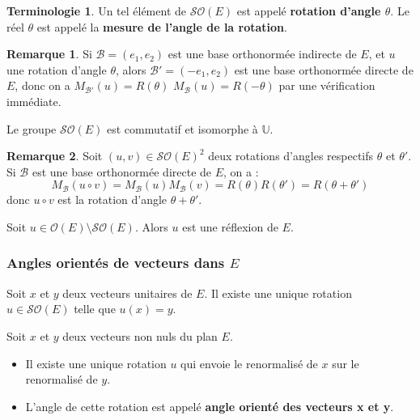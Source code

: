 \documentclass[french]{article}
\newcommand{\U}{\mathbb{U}}
\theoremstyle{plain}
\theoremstyle{definition}
\newtheorem*{rmq}{Remarque}
\newtheorem*{terminologie}{Terminologie}
\theoremstyle{remark}
\begin{document}
\begin{terminologie}
	Un tel élément de $\mathcal{SO}(E)$ est appelé \textbf{rotation d'angle $\theta$}. Le réel $\theta$ est appelé la \textbf{mesure de l'angle de la rotation}.
\end{terminologie}

\begin{rmq}
	Si $\mathcal{B}=(e_1,e_2)$ est une base orthonormée indirecte de $E$, et $u$ une rotation d'angle $\theta$, alors $\mathcal{B}'=(-e_1,e_2)$ est une base orthonormée directe de $E$, donc on a $M_{\mathcal{B}'}(u)=R(\theta)$ $M_{\mathcal{B}}(u)=R(-\theta)$ par une vérification immédiate.
\end{rmq}

\begin{cor}
	Le groupe $\mathcal{SO}(E)$ est commutatif et isomorphe à $\U$.
\end{cor}

\begin{rmq}
	Soit $(u,v)\in\mathcal{SO}(E)^2$ deux rotations d'angles respectifs $\theta$ et $\theta'$. Si $\mathcal{B}$ est une base orthonormée directe de $E$, on a : $$M_\mathcal{B}(u\circ v)=M_\mathcal{B}(u)M_\mathcal{B}(v)=R(\theta)R(\theta')=R(\theta+\theta')$$ donc $u\circ v$ est la rotation d'angle $\theta+\theta'$.
\end{rmq}

\begin{prop}
	Soit $u\in\mathcal{O}(E)\setminus\mathcal{SO}(E)$. Alors $u$ est une réflexion de $E$.
\end{prop}

\subsubsection*{Angles orientés de vecteurs dans $E$}

\begin{prop}
	Soit $x$ et $y$ deux vecteurs unitaires de $E$. Il existe une unique rotation $u\in\mathcal{SO}(E)$ telle que $u(x)=y$.
\end{prop}

\begin{dfn}
	Soit $x$ et $y$ deux vecteurs non nuls du plan $E$.
	\begin{itemize}
		\item Il existe une unique rotation $u$ qui envoie le renormalisé de $x$ sur le renormalisé de $y$.
		\item L'angle de cette rotation est appelé \textbf{angle orienté des vecteurs x et y}.
	\end{itemize}
\end{dfn}
\end{document}

